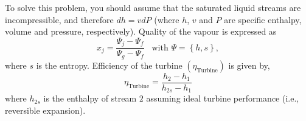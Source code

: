 \documentclass[calculator,steamtables,refrigeranttables,psychrometricchart,datasheet,solutions]{exam}
\newcommand{\frc}{\displaystyle\frac}
\begin{document}
\begin{question}
\begin{enumerate}[(a)]
To solve this problem, you should assume that the saturated liquid streams are incompressible, and therefore $dh = vdP$ (where $h$, $v$ and $P$ are specific enthalpy, volume and pressure, respectively). Quality of the vapour is expressed as
\begin{displaymath}
x_{j} = \frc{\Psi_{j}-\Psi_{f}}{\Psi_{g}-\Psi_{f}}\;\;\;\text{with }\Psi=\left\{h,s\right\},
\end{displaymath}
where $s$ is the entropy. Efficiency of the turbine $\left(\eta_{\text{Turbine}}\right)$ is given by,
\begin{displaymath}
\eta_{\text{Turbine}} =\frc{h_{2}-h_{1}}{h_{2s}-h_{1}}
\end{displaymath}
where $h_{2s}$ is the enthalpy of stream $2$ assuming ideal turbine performance (i.e., reversible expansion). 




\end{enumerate}
\end{question}
\end{document}
